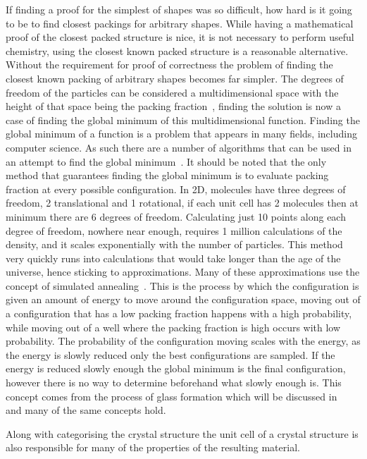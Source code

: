 If finding a proof for the simplest of shapes was so difficult, how hard is it going to be to find closest packings for arbitrary shapes. While having a mathematical proof of the closest packed structure is nice, it is not necessary to perform useful chemistry, using the closest known packed structure is a reasonable alternative. Without the requirement for proof of correctness the problem of finding the closest known packing of arbitrary shapes becomes far simpler. The degrees of freedom of the particles can be considered a multidimensional space with the height of that space being the packing fraction~\figref{}, finding the solution is now a case of finding the global minimum of this multidimensional function. Finding the global minimum of a function is a problem that appears in many fields, including computer science. As such there are a number of algorithms that can be used in an attempt to find the global minimum~\tocite. It should be noted that the only method that guarantees finding the global minimum is to evaluate packing fraction at every possible configuration. In 2D, molecules have three degrees of freedom, 2 translational and 1 rotational, if each unit cell has 2 molecules then at minimum there are 6 degrees of freedom. Calculating just 10 points along each degree of freedom, nowhere near enough, requires 1 million calculations of the density, and it scales exponentially with the number of particles. This method very quickly runs into calculations that would take longer than the age of the universe, hence sticking to approximations. Many of these approximations use the concept of simulated annealing~\tocite. This is the process by which the configuration is given an amount of energy to move around the configuration space, moving out of a configuration that has a low packing fraction happens with a high probability, while moving out of a well where the packing fraction is high occurs with low probability. The probability of the configuration moving scales with the energy, as the energy is slowly reduced only the best configurations are sampled. If the energy is reduced slowly enough the global minimum is the final configuration, however there is no way to determine beforehand what slowly enough is. This concept comes from the process of glass formation which will be discussed in~\secref{} and many of the same concepts hold.




Along with categorising the crystal structure the unit cell of a crystal structure is also responsible for many of the properties of the resulting material.


